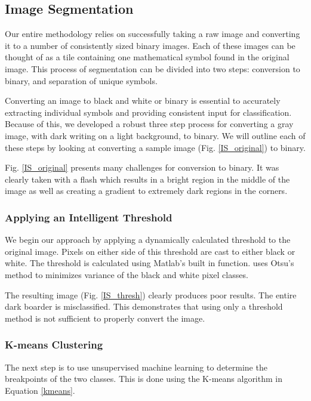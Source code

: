 \subsection{Image Segmentation}
Our entire methodology relies on successfully taking a raw image and converting it to a number of consistently sized binary images. Each of these images can be thought of as a tile containing one mathematical symbol found in the original image. This process of segmentation can be divided into two steps: conversion to binary, and separation of unique symbols.

Converting an image to black and white or binary is essential to accurately extracting individual symbols and providing consistent input for classification. Because of this, we developed a robust three step process for converting a gray image, with dark writing on a light background, to binary. We will outline each of these steps by looking at converting a sample image (Fig. \ref{IS_original}) to binary.


Fig. \ref{IS_original} presents many challenges for conversion to binary. It was clearly taken with a flash which results in a bright region in the middle of the image as well as creating a gradient to extremely dark regions in the corners. 

\subsubsection{Applying an Intelligent Threshold}
We begin our approach by applying a dynamically calculated threshold to the original image. Pixels on either side of this threshold are cast to either black or white. The threshold is calculated using Matlab's built in  function.  uses Otsu's method to minimizes variance of the black and white pixel classes.


The resulting image (Fig. \ref{IS_thresh}) clearly produces poor results. The entire dark boarder is misclassified. This demonstrates that using only a threshold method is not sufficient to properly convert the image.

\subsubsection{K-means Clustering}
The next step is to use unsupervised machine learning to determine the breakpoints of the two classes. This is done using the K-means algorithm in Equation \ref{kmeans}.

